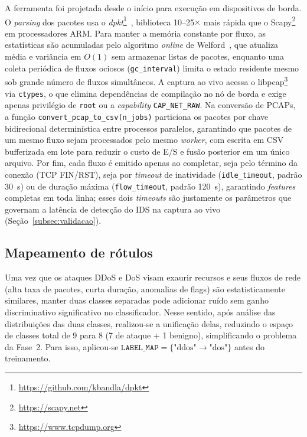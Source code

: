 \documentclass[12pt]{article}
\begin{document}
A ferramenta foi projetada desde o início para execução em dispositivos de
borda. O \textit{parsing} dos pacotes usa o
\textit{dpkt}\footnote{\url{https://github.com/kbandla/dpkt}}~\cite{dpkt},
biblioteca 10--25$\times$ mais rápida que o
Scapy\footnote{\url{https://scapy.net}}~\cite{scapy} em processadores ARM. Para
manter a memória constante por fluxo, as estatísticas são acumuladas pelo
algoritmo \textit{online} de Welford~\cite{welford}, que atualiza média e
variância em $O(1)$ sem armazenar listas de pacotes, enquanto uma coleta
periódica de fluxos ociosos (\texttt{gc\_interval}) limita o estado residente
mesmo sob grande número de fluxos simultâneos. A captura ao vivo acessa o
libpcap\footnote{\url{https://www.tcpdump.org}}~\cite{libpcap} via
\texttt{ctypes}, o que elimina dependências de compilação no nó de borda e exige
apenas privilégio de \texttt{root} ou a \textit{capability}
\texttt{CAP\_NET\_RAW}. Na conversão de PCAPs, a função
\texttt{convert\_pcap\_to\_csv(n\_jobs)} particiona os pacotes por chave
bidirecional determinística entre processos paralelos, garantindo que pacotes de
um mesmo fluxo sejam processados pelo mesmo \textit{worker}, com escrita em CSV
bufferizada em lote para reduzir o custo de E/S e fusão posterior em um único
arquivo. Por fim, cada fluxo é emitido apenas ao completar, seja pelo término da
conexão (TCP FIN/RST), seja por \textit{timeout} de inatividade
(\texttt{idle\_timeout}, padrão 30~s) ou de duração máxima
(\texttt{flow\_timeout}, padrão 120~s), garantindo \textit{features} completas
em toda linha; esses dois \textit{timeouts} são justamente os parâmetros que
governam a latência de detecção do IDS na captura ao vivo
(Seção~\ref{subsec:validacao}).

\subsection{Mapeamento de rótulos}
\label{subsec:rotulos}

Uma vez que os ataques DDoS e DoS visam exaurir recursos e seus fluxos de rede (alta taxa de pacotes, curta duração, anomalias de flags) são estatisticamente similares, manter duas classes separadas pode adicionar ruído sem ganho discriminativo significativo no classificador. Nesse sentido, após análise das distribuições das duas classes, realizou-se a unificação delas, reduzindo o espaço de classes total de 9 para 8 (7 de ataque + 1 benigno), simplificando o problema da Fase~2. Para isso, aplicou-se $\texttt{LABEL\_MAP} = \{\text{"ddos"} \rightarrow \text{"dos"}\}$ antes do treinamento.   
\end{document}
